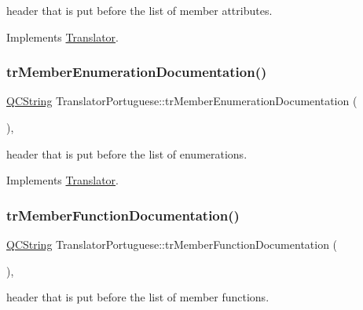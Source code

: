 header that is put before the list of member attributes. 

Implements \mbox{\hyperlink{class_translator}{Translator}}.

\mbox{\label{class_translator_portuguese_aed1576e1ad9622e1a79e0d9250b9039e}} 
\subsubsection{\texorpdfstring{trMemberEnumerationDocumentation()}{trMemberEnumerationDocumentation()}}
{\footnotesize\ttfamily \mbox{\hyperlink{class_q_c_string}{Q\+C\+String}} Translator\+Portuguese\+::tr\+Member\+Enumeration\+Documentation (\begin{DoxyParamCaption}{ }\end{DoxyParamCaption})\hspace{0.3cm}{\ttfamily [inline]}, {\ttfamily [virtual]}}

header that is put before the list of enumerations. 

Implements \mbox{\hyperlink{class_translator}{Translator}}.

\mbox{\label{class_translator_portuguese_a763aeb9393a316c2ef69b13d969e59f1}} 
\subsubsection{\texorpdfstring{trMemberFunctionDocumentation()}{trMemberFunctionDocumentation()}}
{\footnotesize\ttfamily \mbox{\hyperlink{class_q_c_string}{Q\+C\+String}} Translator\+Portuguese\+::tr\+Member\+Function\+Documentation (\begin{DoxyParamCaption}{ }\end{DoxyParamCaption})\hspace{0.3cm}{\ttfamily [inline]}, {\ttfamily [virtual]}}

header that is put before the list of member functions. 

